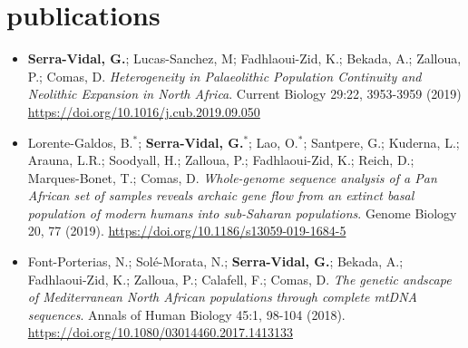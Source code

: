 \documentclass[]{friggeri-cv}
\begin{document}

%


\section{publications}

\begin{itemize}
\item \textbf{\boldfont Serra-Vidal, G.}; Lucas-Sanchez, M; Fadhlaoui-Zid, K.; Bekada, A.; Zalloua, P.; Comas, D. \emph{Heterogeneity in Palaeolithic Population Continuity and Neolithic Expansion in North Africa}. Current Biology 29:22, 3953-3959 (2019) \url{https://doi.org/10.1016/j.cub.2019.09.050}


\item Lorente-Galdos, B.$^*$; \textbf{\boldfont Serra-Vidal, G.$^*$}; Lao, O.$^*$; Santpere, G.; Kuderna, L.; Arauna, L.R.; Soodyall, H.; Zalloua, P.; Fadhlaoui-Zid, K.; Reich, D.; Marques-Bonet, T.; Comas, D. \emph{Whole-genome sequence analysis of a Pan African set of samples reveals archaic gene flow from an extinct basal population of modern humans into sub-Saharan populations}. Genome Biology 20, 77 (2019). \url{https://doi.org/10.1186/s13059-019-1684-5}


\item Font-Porterias, N.;  Solé-Morata, N.; \textbf{\boldfont Serra-Vidal, G.}; Bekada, A.; Fadhlaoui-Zid, K.; Zalloua, P.; Calafell, F.; Comas, D. \emph{The genetic andscape of Mediterranean North African populations through complete mtDNA sequences}. Annals of Human Biology 45:1, 98-104 (2018).  \url{https://doi.org/10.1080/03014460.2017.1413133}
\end{itemize}



~
\end{document}
